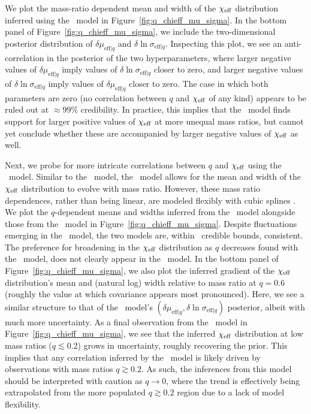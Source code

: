 We plot the mass-ratio dependent mean and width of the $\chi_{\rm eff}$ distribution inferred using the \linearcorrelation~model in Figure~\ref{fig:q_chieff_mu_sigma}.
In the bottom panel of Figure~\ref{fig:q_chieff_mu_sigma}, we include the two-dimensional posterior distribution of $\delta \mu_{\mathrm{eff}|q}$ and $\delta \ln \sigma_{\mathrm{eff}|q}$.
Inspecting this plot, we see an anti-correlation in the posterior of the two hyperparameters, where larger negative values of $\delta \mu_{\mathrm{eff}|q}$ imply values of $\delta \ln \sigma_{\mathrm{eff}|q}$ closer to zero, and larger negative values of $\delta \ln \sigma_{\mathrm{eff}|q}$ imply values of $\delta \mu_{\mathrm{eff}|q}$ closer to zero.
The case in which both parameters are zero (no correlation between $q$ and $\chi_{\rm eff}$ of any kind) appears to be ruled out at $\approx 99\%$ credibility.
In practice, this implies that the \linearcorrelation~model finds support for larger positive values of $\chi_{\rm eff}$ at more unequal mass ratios, but cannot yet conclude whether these are accompanied by larger negative values of $\chi_{\rm eff}$ as well.

Next, we probe for more intricate correlations between $q$ and $\chi_{\rm eff}$ using the \splinecorrelation~model.
Similar to the \linearcorrelation~model, the \splinecorrelation~model allows for the mean and width of the $\chi_{\rm eff}$ distribution to evolve with mass ratio.
However, these mass ratio dependences, rather than being linear, are modeled flexibly with cubic splines \citep[see Appendix~\ref{appendix:LinearCorrelationModels} and][]{Heinzel:2023hlb}.
We plot the $q$-dependent means and widths inferred from the \splinecorrelation~model alongside those from the \linearcorrelation~model in Figure~\ref{fig:q_chieff_mu_sigma}.
Despite fluctuations emerging in the \splinecorrelation~model, the two models are, within \confidenceLevel~credible bounds, consistent.
The preference for broadening in the $\chi_{\rm eff}$ distribution as $q$ decreases found with the \linearcorrelation~model, does not clearly appear in the \splinecorrelation~model.
In the bottom panel of Figure~\ref{fig:q_chieff_mu_sigma}, we also plot the inferred gradient of the $\chi_{\rm eff}$ distribution's mean and (natural log) width relative to mass ratio at $q = 0.6$ (roughly the value at which covariance appears most pronounced).
Here, we see a similar structure to that of the \linearcorrelation~model's $(\delta \mu_{\mathrm{eff}|q}, \delta \ln \sigma_{\mathrm{eff}|q})$ posterior, albeit with much more uncertainty.
As a final observation from the \splinecorrelation~model in Figure~\ref{fig:q_chieff_mu_sigma}, we see that the inferred $\chi_{\rm eff}$ distribution at low mass ratios ($q \lesssim 0.2$) grows in uncertainty, roughly recovering the prior.
This implies that any correlation inferred by the \linearcorrelation~model is likely driven by observations with mass ratios $q \gtrsim 0.2$.
As such, the inferences from this model should be interpreted with caution as $q \rightarrow 0$, where the trend is effectively being extrapolated from the more populated $q \gtrsim 0.2$ region due to a lack of model flexibility.

